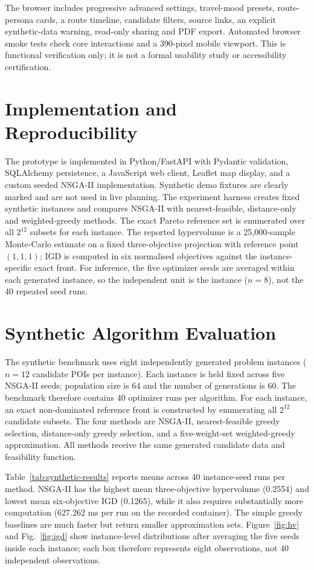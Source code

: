 \documentclass[10pt,conference]{IEEEtran}
\begin{document}
The browser includes progressive advanced settings, travel-mood presets, route-persona cards, a route timeline, candidate filters, source links, an explicit synthetic-data warning, read-only sharing and PDF export. Automated browser smoke tests check core interactions and a 390-pixel mobile viewport. This is functional verification only; it is not a formal usability study or accessibility certification.

\section{Implementation and Reproducibility}
The prototype is implemented in Python/FastAPI with Pydantic validation, SQLAlchemy persistence, a JavaScript web client, Leaflet map display, and a custom seeded NSGA-II implementation. Synthetic demo fixtures are clearly marked and are not used in live planning. The experiment harness creates fixed synthetic instances and compares NSGA-II with nearest-feasible, distance-only and weighted-greedy methods. The exact Pareto reference set is enumerated over all $2^{12}$ subsets for each instance. The reported hypervolume is a 25,000-sample Monte-Carlo estimate on a fixed three-objective projection with reference point $(1,1,1)$; IGD is computed in six normalised objectives against the instance-specific exact front. For inference, the five optimizer seeds are averaged within each generated instance, so the independent unit is the instance ($n=8$), not the 40 repeated seed runs.

\section{Synthetic Algorithm Evaluation}
The synthetic benchmark uses eight independently generated problem instances ($n=12$ candidate POIs per instance). Each instance is held fixed across five NSGA-II seeds; population size is 64 and the number of generations is 60. The benchmark therefore contains 40 optimizer runs per algorithm. For each instance, an exact non-dominated reference front is constructed by enumerating all $2^{12}$ candidate subsets. The four methods are NSGA-II, nearest-feasible greedy selection, distance-only greedy selection, and a five-weight-set weighted-greedy approximation. All methods receive the same generated candidate data and feasibility function.

Table~\ref{tab:synthetic-results} reports means across 40 instance-seed runs per method. NSGA-II has the highest mean three-objective hypervolume (0.2554) and lowest mean six-objective IGD (0.1265), while it also requires substantially more computation (627.262 ms per run on the recorded container). The simple greedy baselines are much faster but return smaller approximation sets. Figure~\ref{fig:hv} and Fig.~\ref{fig:igd} show instance-level distributions after averaging the five seeds inside each instance; each box therefore represents eight observations, not 40 independent observations.
\end{document}
